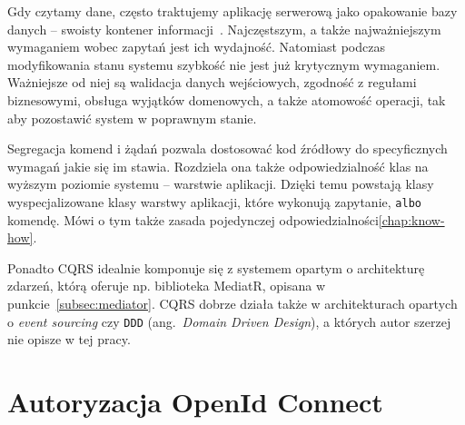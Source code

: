 Gdy czytamy dane, często traktujemy aplikację serwerową jako opakowanie bazy danych -- swoisty kontener informacji~\cite{cqrs-fowler}. Najczęstszym, a także najważniejszym wymaganiem wobec zapytań jest ich wydajność. Natomiast podczas modyfikowania stanu systemu szybkość nie jest już krytycznym wymaganiem. Ważniejsze od niej są walidacja danych wejściowych, zgodność z regułami biznesowymi, obsługa wyjątków domenowych, a także atomowość operacji, tak aby pozostawić system w poprawnym stanie.

Segregacja komend i żądań pozwala dostosować kod źródłowy do specyficznych wymagań jakie się im stawia. Rozdziela ona także odpowiedzialność klas na wyższym poziomie systemu -- warstwie aplikacji. Dzięki temu powstają klasy wyspecjalizowane klasy warstwy aplikacji, które wykonują zapytanie, \texttt{albo} komendę. Mówi o tym także zasada pojedynczej odpowiedzialności\ref{chap:know-how}.

Ponadto CQRS idealnie komponuje się z systemem opartym o architekturę zdarzeń, którą oferuje np. biblioteka MediatR, opisana w punkcie~\ref{subsec:mediator}. CQRS dobrze działa także w architekturach opartych o \emph{event sourcing} czy \texttt{DDD} (ang.~\emph{Domain Driven Design}), a których autor szerzej nie opisze w tej pracy. 

\section{Autoryzacja OpenId Connect}
\label{sec:autoryzacja}
